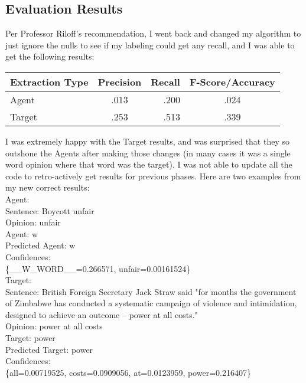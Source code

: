 \documentclass{article}
\begin{document}
\subsection{Evaluation Results}

Per Professor Riloff's recommendation, I went back and changed my algorithm to just ignore the nulls to see if my labeling could get any recall, and I was able to get the following results:\\

\begin{center} 

        \begin{tabular}{ | l | c | r | c}
            \hline
            Extraction Type & Precision & Recall & F-Score/Accuracy \\ \hline
            Agent & .013 & .200 & .024\\ \hline
            Target & .253 & .513 & .339\\ \hline
        \end{tabular}
    \end{center}
    
    I was extremely happy with the Target results, and was surprised that they so outshone the Agents after making those changes (in many cases it was a single word opinion where that word was the target). I was not able to update all the code to retro-actively get results for previous phases. Here are two examples from my new correct results: \\
    
    Agent: \\
Sentence: Boycott unfair\\
Opinion: unfair\\
Agent: w\\
Predicted Agent: w\\
Confidences:\\
\{\_\_W\_WORD\_\_=0.266571, unfair=0.00161524\}\\

Target:\\
Sentence: British Foreign Secretary Jack Straw said "for months the government of Zimbabwe has conducted a systematic campaign of violence and intimidation, designed to achieve an outcome -- power at all costs."\\
Opinion: power at all costs\\
Target: power\\
Predicted Target: power\\
Confidences:\\
\{all=0.00719525, costs=0.0909056, at=0.0123959, power=0.216407\}\\
\end{document}
